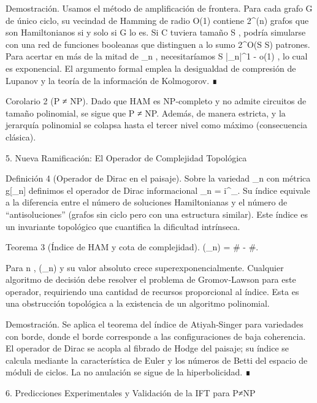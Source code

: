 \documentclass[12pt,a4paper]{book}
\begin{document}
Demostración. Usamos el método de amplificación de frontera. Para cada grafo  G  de único ciclo, su vecindad de Hamming de radio  O(1)  contiene  2^{\Omega(n)}  grafos que son Hamiltonianos si y solo si  G  lo es. Si  C  tuviera tamaño  S , podría simularse con una red de funciones booleanas que distinguen a lo sumo  2^{O(S \log S)}  patrones. Para acertar en más de la mitad de  _n , necesitaríamos  S \ge |_n|^{1 - o(1)} , lo cual es exponencial. El argumento formal emplea la desigualdad de compresión de Lupanov y la teoría de la información de Kolmogorov. ∎

Corolario 2 (P ≠ NP).
Dado que HAM es NP‑completo y no admite circuitos de tamaño polinomial, se sigue que P ≠ NP. Además,   \subsetneq {}  de manera estricta, y la jerarquía polinomial se colapsa hasta el tercer nivel como máximo (consecuencia clásica).

5. Nueva Ramificación: El Operador de Complejidad Topológica

Definición 4 (Operador de Dirac en el paisaje).
Sobre la variedad  _n  con métrica  g[\rho_n]  definimos el operador de Dirac informacional  _n = i\gamma^\mu \nabla_\mu . Su índice equivale a la diferencia entre el número de soluciones Hamiltonianas y el número de “antisoluciones” (grafos sin ciclo pero con una estructura similar). Este índice es un invariante topológico que cuantifica la dificultad intrínseca.

Teorema 3 (Índice de HAM y cota de complejidad).
(_n) = \# - \#. 

Para  n  ,  (_n)   y su valor absoluto crece superexponencialmente. Cualquier algoritmo de decisión debe resolver el problema de Gromov‑Lawson para este operador, requiriendo una cantidad de recursos proporcional al índice. Esta es una obstrucción topológica a la existencia de un algoritmo polinomial.

Demostración. Se aplica el teorema del índice de Atiyah‑Singer para variedades con borde, donde el borde corresponde a las configuraciones de baja coherencia. El operador de Dirac se acopla al fibrado de Hodge del paisaje; su índice se calcula mediante la característica de Euler y los números de Betti del espacio de móduli de ciclos. La no anulación se sigue de la hiperbolicidad. ∎

6. Predicciones Experimentales y Validación de la IFT para P≠NP
\end{document}
